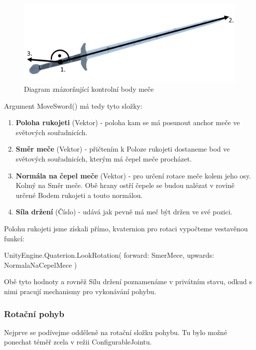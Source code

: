 \begin{figure}[ht]\centering
  \center
  \includegraphics[width=140mm]{../img/diagram-swordPositioning.png}
  \caption{Diagram znázorňující kontrolní body meče}
  \label{obr05:swordPositioningDiagram}
\end{figure} 

Argument MoveSword() má tedy tyto složky:
\begin{enumerate}
    \item \textbf{Poloha rukojeti} (Vektor) - poloha kam se má posunout anchor meče ve světových souřadnicích.
    \item \textbf{Směr meče} (Vektor) - přičtením k Poloze rukojeti dostaneme bod ve světových souřadnicích, kterým má čepel meče procházet.
    \item \textbf{Normála na čepel meče} (Vektor) - pro určení rotace meče kolem jeho osy. Kolmý na Směr meče. Obě hrany ostří čepele se budou nalézat v rovině určené Bodem rukojeti a touto normálou.   
    \item \textbf{Síla držení} (Číslo) - udává jak pevně má meč být držen ve své pozici.
\end{enumerate}

Polohu rukojeti jsme získali přímo, kvaternion pro rotaci vypočteme vestavěnou funkcí:

\begin{code}
 UnityEngine.Quaterion.LookRotation(
   forward: SmerMece,
   upwards: NormalaNaCepelMece
 )
\end{code}

Obě tyto hodnoty a rovněž Sílu držení poznamenáme v privátním stavu, odkud s nimi pracují mechanismy pro vykonávání pohybu.

\subsubsection*{Rotační pohyb} \label{implementationSwordAngularMovementSubsubsection}

Nejprve se podívejme odděleně na rotační složku pohybu. Tu bylo možné ponechat téměř zcela v režii ConfigurableJointu.

